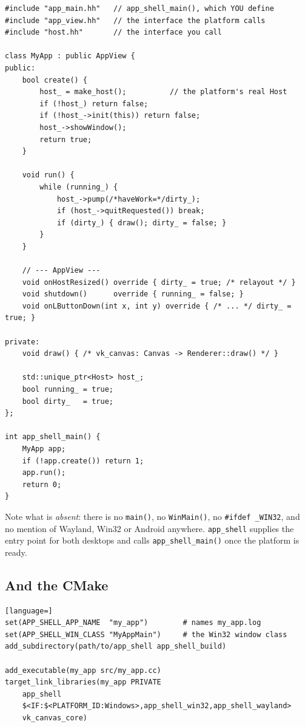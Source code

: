 \documentclass[11pt,a4paper]{article}
\begin{document}
\begin{lstlisting}
#include "app_main.hh"   // app_shell_main(), which YOU define
#include "app_view.hh"   // the interface the platform calls
#include "host.hh"       // the interface you call

class MyApp : public AppView {
public:
    bool create() {
        host_ = make_host();          // the platform's real Host
        if (!host_) return false;
        if (!host_->init(this)) return false;
        host_->showWindow();
        return true;
    }

    void run() {
        while (running_) {
            host_->pump(/*haveWork=*/dirty_);
            if (host_->quitRequested()) break;
            if (dirty_) { draw(); dirty_ = false; }
        }
    }

    // --- AppView ---
    void onHostResized() override { dirty_ = true; /* relayout */ }
    void shutdown()      override { running_ = false; }
    void onLButtonDown(int x, int y) override { /* ... */ dirty_ = true; }

private:
    void draw() { /* vk_canvas: Canvas -> Renderer::draw() */ }

    std::unique_ptr<Host> host_;
    bool running_ = true;
    bool dirty_   = true;
};

int app_shell_main() {
    MyApp app;
    if (!app.create()) return 1;
    app.run();
    return 0;
}
\end{lstlisting}

Note what is \emph{absent}: there is no \texttt{main()}, no \texttt{WinMain()},
no \texttt{\#ifdef \_WIN32}, and no mention of Wayland, Win32 or Android
anywhere. \texttt{app\_shell} supplies the entry point for both desktops and
calls \texttt{app\_shell\_main()} once the platform is ready.

\subsection{And the CMake}

\begin{lstlisting}[language=]
set(APP_SHELL_APP_NAME  "my_app")        # names my_app.log
set(APP_SHELL_WIN_CLASS "MyAppMain")     # the Win32 window class
add_subdirectory(path/to/app_shell app_shell_build)

add_executable(my_app src/my_app.cc)
target_link_libraries(my_app PRIVATE
    app_shell
    $<IF:$<PLATFORM_ID:Windows>,app_shell_win32,app_shell_wayland>
    vk_canvas_core)
\end{lstlisting}
\end{document}
